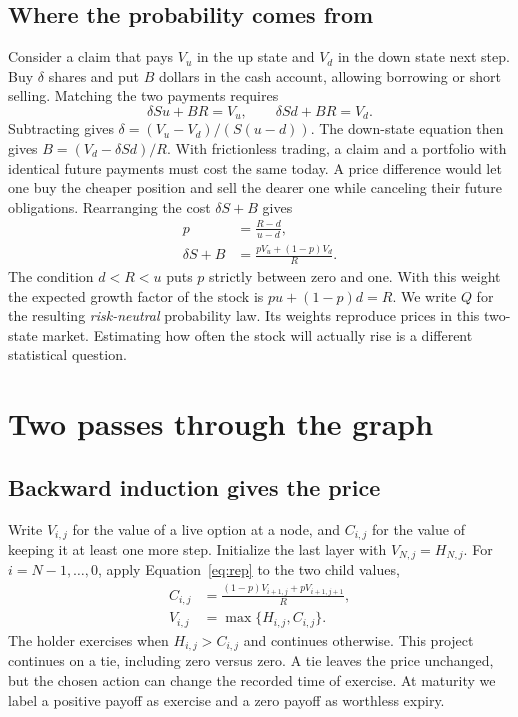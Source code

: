 \documentclass[11pt]{article}
\begin{document}
\subsection{Where the probability comes from}
Consider a claim that pays $V_u$ in the up state and $V_d$ in the down state next step. Buy $\delta$ shares and put $B$ dollars in the cash account, allowing borrowing or short selling. Matching the two payments requires
\[
 \delta Su+BR=V_u,\qquad \delta Sd+BR=V_d.
\]
Subtracting gives $\delta=(V_u-V_d)/(S(u-d))$. The down-state equation then gives $B=(V_d-\delta Sd)/R$. With frictionless trading, a claim and a portfolio with identical future payments must cost the same today. A price difference would let one buy the cheaper position and sell the dearer one while canceling their future obligations. Rearranging the cost $\delta S+B$ gives
\begin{align}
p &= \frac{R-d}{u-d}, \label{eq:p}\\
\delta S+B &= \frac{pV_u+(1-p)V_d}{R}. \label{eq:rep}
\end{align}
The condition $d<R<u$ puts $p$ strictly between zero and one. With this weight the expected growth factor of the stock is $pu+(1-p)d=R$. We write $Q$ for the resulting \emph{risk-neutral} probability law. Its weights reproduce prices in this two-state market. Estimating how often the stock will actually rise is a different statistical question.

\section{Two passes through the graph}
\subsection{Backward induction gives the price}
Write $V_{i,j}$ for the value of a live option at a node, and $C_{i,j}$ for the value of keeping it at least one more step. Initialize the last layer with $V_{N,j}=H_{N,j}$. For $i=N-1,\ldots,0$, apply Equation~\eqref{eq:rep} to the two child values,
\begin{align}
 C_{i,j}&=\frac{(1-p)V_{i+1,j}+pV_{i+1,j+1}}{R},\label{eq:continue}\\
 V_{i,j}&=\max\{H_{i,j},C_{i,j}\}. \label{eq:stop}
\end{align}
The holder exercises when $H_{i,j}>C_{i,j}$ and continues otherwise. This project continues on a tie, including zero versus zero. A tie leaves the price unchanged, but the chosen action can change the recorded time of exercise. At maturity we label a positive payoff as exercise and a zero payoff as worthless expiry.
\end{document}
